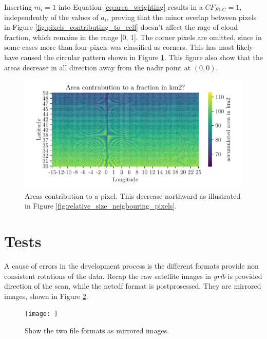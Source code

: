 Inserting $m_i = 1$ into Equation \eqref{eq:area_weighting} results in a $CF_{ECC}=1$, independently of the values of $a_i$, proving that the minor overlap between pixels in Figure \ref{fig:pixels_contributing_to_cell} doesn't affect the rage of cloud fraction, which remains in the range [0, 1]. The corner pixels are omitted, since in some cases more than four pixels was classified as corners. This has most likely have caused the circular pattern shown in Figure \ref{fig:area_pixel_signal}. This figure also show that the areas decrease in all direction away from the nadir point at $(0,0)$.
\begin{figure}[ht]
    \centering
    \includegraphics{python_figs/signal_area_pixel.pdf}
    \caption{Areas contribution to a pixel. This decrease northward as illustrated in Figure \ref{fig:relative_size_neigbouring_pixels}.}
    \label{fig:area_pixel_signal}
\end{figure} 

\section{Tests}
A cause of errors in the development process is the different formats provide non consistent rotations of the data. Recap the raw satellite images in \textit{grib} is provided  direction of the scan, while the \acrshort{netcdf} format is postprosessed. They are mirrored images, shown in Figure \ref{fig:netcdf_vs_grib}. 
\begin{figure}
    \centering
    \texttt{[image: ]}
    \caption{Show the two file formats as mirrored images.}
    \label{fig:netcdf_vs_grib}
\end{figure}

